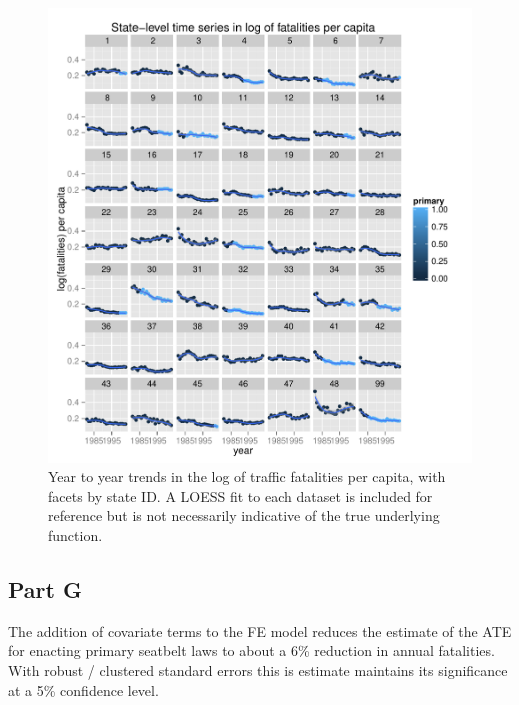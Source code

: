 \documentclass[letterpaper, 12pt]{article}
\begin{document}
\begin{figure}[htbp]
\begin{center}
\includegraphics{allstates.pdf}
\caption{Year to year trends in the log of traffic fatalities per capita, with facets by state ID.  A LOESS fit to each dataset is included for reference but is not necessarily indicative of the true underlying function.}
\label{fig:3f}
\end{center}
\end{figure}


\subsection{Part G}

The addition of covariate terms to the FE model reduces the estimate of the ATE for enacting primary seatbelt laws to about a 6\% reduction in annual fatalities.  With robust / clustered standard errors this is estimate maintains its significance at a 5\% confidence level. 


\end{document}
